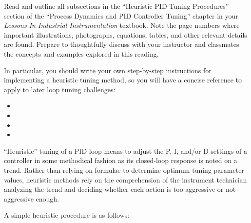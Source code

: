 

Read and outline all subsections in the ``Heuristic PID Tuning Procedures'' section of the ``Process Dynamics and PID Controller Tuning'' chapter in your {\it Lessons In Industrial Instrumentation} textbook.  Note the page numbers where important illustrations, photographs, equations, tables, and other relevant details are found.  Prepare to thoughtfully discuss with your instructor and classmates the concepts and examples explored in this reading.

\vskip 10pt

In particular, you should write your own step-by-step instructions for implementing a heuristic tuning method, so you will have a concise reference to apply to later loop tuning challenges:

\begin{itemize}
\item{} 
\vskip 10pt
\item{} 
\vskip 10pt
\item{} 
\vskip 10pt
\item{} 
\end{itemize}















``Heuristic'' tuning of a PID loop means to adjust the P, I, and/or D settings of a controller in some methodical fashion as its closed-loop response is noted on a trend.  Rather than relying on formulae to determine optimum tuning parameter values, heuristic methods rely on the comprehension of the instrument technician analyzing the trend and deciding whether each action is too aggressive or not aggressive enough.

\vskip 10pt

\noindent
A simple heuristic procedure is as follows:

